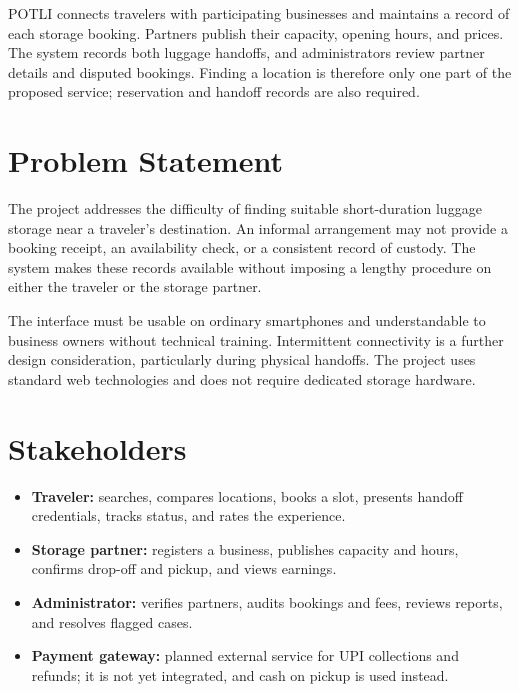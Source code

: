 \documentclass{tietreport}
\begin{document}
POTLI connects travelers with participating businesses and maintains a record of each storage booking. Partners publish their capacity, opening hours, and prices. The system records both luggage handoffs, and administrators review partner details and disputed bookings. Finding a location is therefore only one part of the proposed service; reservation and handoff records are also required.

\section{Problem Statement}
The project addresses the difficulty of finding suitable short-duration luggage storage near a traveler's destination. An informal arrangement may not provide a booking receipt, an availability check, or a consistent record of custody. The system makes these records available without imposing a lengthy procedure on either the traveler or the storage partner.

The interface must be usable on ordinary smartphones and understandable to business owners without technical training. Intermittent connectivity is a further design consideration, particularly during physical handoffs. The project uses standard web technologies and does not require dedicated storage hardware.

\section{Stakeholders}
\begin{itemize}[leftmargin=*]
  \item \textbf{Traveler:} searches, compares locations, books a slot, presents handoff credentials, tracks status, and rates the experience.
  \item \textbf{Storage partner:} registers a business, publishes capacity and hours, confirms drop-off and pickup, and views earnings.
  \item \textbf{Administrator:} verifies partners, audits bookings and fees, reviews reports, and resolves flagged cases.
  \item \textbf{Payment gateway:} planned external service for UPI collections and refunds; it is not yet integrated, and cash on pickup is used instead.
\end{itemize}
\end{document}

